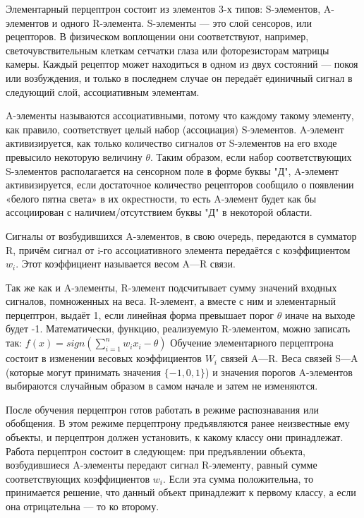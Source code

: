 Элементарный перцептрон состоит из элементов 3-х типов: S-элементов, A-элементов и одного R-элемента. S-элементы — это слой сенсоров, или рецепторов. В физическом воплощении они соответствуют, например, светочувствительным клеткам сетчатки глаза или фоторезисторам матрицы камеры. Каждый рецептор может находиться в одном из двух состояний — покоя или возбуждения, и только в последнем случае он передаёт единичный сигнал в следующий слой, ассоциативным элементам.

A-элементы называются ассоциативными, потому что каждому такому элементу, как правило, соответствует целый набор (ассоциация) S-элементов. A-элемент активизируется, как только количество сигналов от S-элементов на его входе превысило некоторую величину $\theta$. Таким образом, если набор соответствующих S-элементов располагается на сенсорном поле в форме буквы "Д", A-элемент активизируется, если достаточное количество рецепторов сообщило о появлении «белого пятна света» в их окрестности, то есть A-элемент будет как бы ассоциирован с наличием/отсутствием буквы "Д" в некоторой области.

Сигналы от возбудившихся A-элементов, в свою очередь, передаются в сумматор R, причём сигнал от i-го ассоциативного элемента передаётся с коэффициентом $w_i$. Этот коэффициент называется весом A—R связи.

Так же как и A-элементы, R-элемент подсчитывает сумму значений входных сигналов, помноженных на веса. R-элемент, а вместе с ним и элементарный перцептрон, выдаёт 1, если линейная форма превышает порог $\theta$ иначе на выходе будет -1. Математически, функцию, реализуемую R-элементом, можно записать так:
$f(x) = sign(\sum_{i=1}^{n} w_i x_i - \theta)$
Обучение элементарного перцептрона состоит в изменении весовых коэффициентов $W_i$ связей A—R. Веса связей S—A (которые могут принимать значения $\{ -1, 0, 1 \}$) и значения порогов A-элементов выбираются случайным образом в самом начале и затем не изменяются.

После обучения перцептрон готов работать в режиме распознавания или обобщения. В этом режиме перцептрону предъявляются ранее неизвестные ему объекты, и перцептрон должен установить, к какому классу они принадлежат. Работа перцептрон состоит в следующем: при предъявлении объекта, возбудившиеся A-элементы передают сигнал R-элементу, равный сумме соответствующих коэффициентов $w_i$. Если эта сумма положительна, то принимается решение, что данный объект принадлежит к первому классу, а если она отрицательна — то ко второму.

